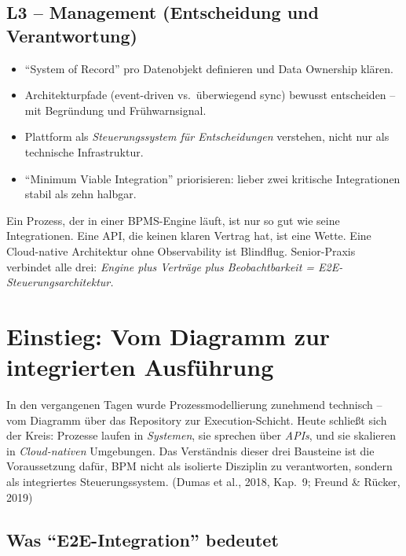 \documentclass[11pt,a4paper,oneside]{article}
\newcommand{\quelle}[1]{{\footnotesize\color{lpGray}(#1)}}
\begin{document}
\subsection*{L3 -- Management (Entscheidung und Verantwortung)}
\begin{itemize}
  \item ``System of Record'' pro Datenobjekt definieren und Data Ownership klären.
  \item Architekturpfade (event-driven vs.\ überwiegend sync) bewusst entscheiden -- mit Begründung und Frühwarnsignal.
  \item Plattform als \emph{Steuerungssystem für Entscheidungen} verstehen, nicht nur als technische Infrastruktur.
  \item ``Minimum Viable Integration'' priorisieren: lieber zwei kritische Integrationen stabil als zehn halbgar.
\end{itemize}

\begin{merkbox}
Ein Prozess, der in einer BPMS-Engine läuft, ist nur so gut wie seine Integrationen. Eine API, die keinen klaren Vertrag hat, ist eine Wette. Eine Cloud-native Architektur ohne Observability ist Blindflug. Senior-Praxis verbindet alle drei: \emph{Engine plus Verträge plus Beobachtbarkeit = E2E-Steuerungsarchitektur.}
\end{merkbox}

\clearpage

\section{Einstieg: Vom Diagramm zur integrierten Ausführung}

In den vergangenen Tagen wurde Prozessmodellierung zunehmend technisch -- vom Diagramm über das Repository zur Execution-Schicht. Heute schließt sich der Kreis: Prozesse laufen in \emph{Systemen}, sie sprechen über \emph{APIs}, und sie skalieren in \emph{Cloud-nativen} Umgebungen. Das Verständnis dieser drei Bausteine ist die Voraussetzung dafür, BPM nicht als isolierte Disziplin zu verantworten, sondern als integriertes Steuerungssystem. \quelle{Dumas et al., 2018, Kap.~9; Freund \& Rücker, 2019}

\subsection{Was ``E2E-Integration'' bedeutet}
\end{document}
